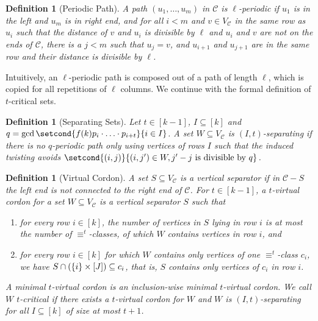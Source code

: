 \documentclass[10pt,a4paper]{article}
\newcommand{\defining}[1]{\emph{#1}}
\DeclarePairedDelimiter\set{\lbrace}{\rbrace}
\newcommand{\comp}{\equiv}
\newcommand{\grid}{\mathcal{C}}
\newcommand{\vertexC}{V_{\mathcal{C}}}
\newtheorem{definition}[theorem]{Definition}
\newcommand{\confORfull}[2]{#1}
\begin{document}
	
	\begin{definition}[Periodic Path]
		A path $(u_1,\dots,u_m)$ in $\grid$ is \defining{$\ell$-periodic} if $u_1$ is in the left and $u_m$ is in right end, and for
		all $i < m$ and $v \in \vertexC$ in the same row as $u_i$ such that 
		the distance of $v$ and $u_i$ is divisible by $\ell$
		and $u_i$ and $v$ are not on the ends of $\grid$,
		there is a $j < m$ such that $u_j = v$, and
		$u_{i+1}$ and $u_{j+1}$ are in the same row
		and their distance is divisible by $\ell$.
	\end{definition}
	
	\noindent Intuitively, an $\ell$-periodic path is composed out of a path of length $\ell$,
	which is copied for all repetitions of $\ell$ columns.
	We continue with the formal definition of $t$-critical sets.

	
	\begin{definition}[Separating Sets]
		Let $t \in [k-1]$, $I \subseteq [k]$ and $q = \gcd \setcond{f(k)p_i\cdot \ldots \cdot  p_{i+t}}{i \in I}$. A set $W\subseteq \vertexC$ is \defining{$(I,t)$-separating}
		if there is no $q$-periodic path only using vertices of rows $I$ such that the induced twisting avoids 
		$\setcond{(i,j)}{(i,j') \in W, j'-j \text{ is divisible by }q}$.
	\end{definition}
	
	
	\begin{definition}[Virtual Cordon]
		A set $S \subseteq \vertexC$ 
		is a \defining{vertical separator}
		if in  $\grid-S$ 
		the left end is not connected to the right end of $\grid$.
		For $t \in [k-1]$, a \defining{$t$-virtual cordon} for a set  $W \subseteq \vertexC$ is a vertical separator $S$ such that
		\begin{enumerate}
			\item for every row $i \in [k]$, 
			the number of vertices in $S$ lying in row $i$
			is at most the number of $\comp^t$-classes,
			of which $W$ contains vertices in row $i$, and
			\item for every row $i \in [k]$ for which $W$ contains only vertices of one $\comp^t$-class $c_i$,
			we have $S\cap (\set{i}\times [J]) \subseteq c_i$,
			that is, $S$ contains only vertices of $c_i$ in row $i$.
		\end{enumerate}
		A \defining{minimal} $t$-virtual cordon is an inclusion-wise minimal $t$-virtual cordon.
		We call \confORfull{}{the set} $W$ \defining{$t$\nobreakdash-critical} if there exists a $t$-virtual cordon for $W$ and $W$ is $(I,t)$-separating for all $I \subseteq [k]$ of size at most $t+1$.
	\end{definition}
	
\end{document}

